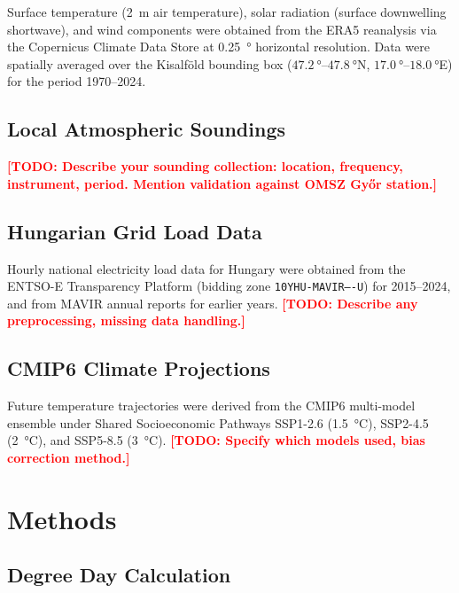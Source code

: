 \documentclass[11pt,a4paper]{article}
\newcommand{\todo}[1]{\textcolor{red}{\textbf{[TODO: #1]}}}
\begin{document}
Surface temperature (\SI{2}{\metre} air temperature), solar radiation 
(surface downwelling shortwave), and wind components were obtained from 
the ERA5 reanalysis \citep{hersbach2020era5} via the Copernicus Climate 
Data Store at \SI{0.25}{\degree} horizontal resolution. Data were spatially 
averaged over the Kisalf\"{o}ld bounding box 
($\SI{47.2}{\degree}$--$\SI{47.8}{\degree}$N, 
$\SI{17.0}{\degree}$--$\SI{18.0}{\degree}$E) 
for the period 1970--2024.

\subsection{Local Atmospheric Soundings}
\label{sec:data_soundings}

\todo{Describe your sounding collection: location, frequency, instrument, 
period. Mention validation against OMSZ Gy\H{o}r station.}

\subsection{Hungarian Grid Load Data}
\label{sec:data_load}

Hourly national electricity load data for Hungary were obtained from 
the ENTSO-E Transparency Platform \citep{entsoe} 
(bidding zone \texttt{10YHU-MAVIR----U}) for 2015--2024, 
and from MAVIR annual reports for earlier years. \todo{Describe any 
preprocessing, missing data handling.}

\subsection{CMIP6 Climate Projections}
\label{sec:data_cmip6}

Future temperature trajectories were derived from the CMIP6 multi-model 
ensemble \citep{eyring2016cmip6} under Shared Socioeconomic Pathways 
SSP1-2.6 (\SI{1.5}{\celsius}), SSP2-4.5 (\SI{2}{\celsius}), and 
SSP5-8.5 (\SI{3}{\celsius}). \todo{Specify which models used, 
bias correction method.}

\section{Methods}
\label{sec:methods}

\subsection{Degree Day Calculation}
\label{sec:methods_dd}
\end{document}
